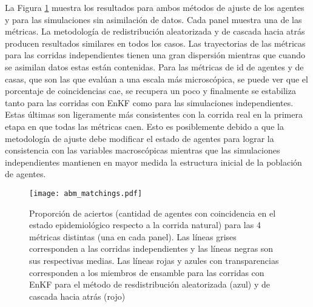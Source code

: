 La Figura \ref{fig:abm_matchings} muestra los resultados para ambos métodos de ajuste de los agentes y para las simulaciones sin asimilación de datos. Cada panel muestra una de las métricas. La metodología de redistribución aleatorizada y de cascada hacia atrás producen resultados similares en todos los casos. Las trayectorias de las métricas para las corridas independientes tienen una gran dispersión mientras que cuando se asimilan datos estas están contenidas. Para las métricas de id de agentes y de casas, que son las que evalúan a una escala más microscópica, se puede ver que el porcentaje de coincidencias cae, se recupera un poco y finalmente se estabiliza tanto para las corridas con EnKF como para las simulaciones independientes. Estas últimas son ligeramente más consistentes con la corrida real en la primera etapa en que todas las métricas caen. Esto es posiblemente debido a que la metodología de ajuste debe modificar el estado de agentes para lograr la consistencia con las variables macroscópicas mientras que las simulaciones independientes mantienen en mayor medida la estructura inicial de la población de agentes.
\begin{figure}[h]
    \centering
    \texttt{[image: abm\_matchings.pdf]}
    \caption{Proporción de aciertos (cantidad de agentes con coincidencia en el estado epidemiológico respecto a la corrida natural) para las 4 métricas distintas (una en cada panel). Las líneas grises corresponden a las corridas independientes y las líneas negras son sus respectivas medias. Las líneas rojas y azules con transparencias corresponden a los miembros de ensamble para las corridas con EnKF para el método de resdistribución aleatorizada (azul) y de cascada hacia atrás (rojo)}
    \label{fig:abm_matchings}
\end{figure}

